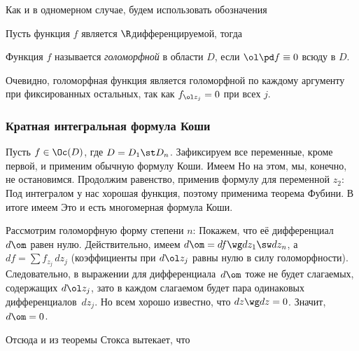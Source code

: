 \documentclass[a4paper]{article}
\begin{document}
Как и в одномерном случае, будем использовать обозначения

Пусть функция $f$ является $\R$\д дифференцируемой, тогда

\begin{df}
Функция $f$ называется \emph{голоморфной} в области $D$, если $\ol \pd f \equiv 0$ всюду в $D$.
\end{df}

Очевидно, голоморфная функция является голоморфной по каждому аргументу при фиксированных
остальных, так как $f_{\ol z_j}=0$ при всех $j$.

\subsubsection{Кратная интегральная формула Коши}

Пусть $f\in \Oc(D)$, где $D = D_1 \st D_n$. Зафиксируем все переменные, кроме первой,
и применим обычную формулу Коши. Имеем
Но на этом, мы, конечно, не остановимся. Продолжим равенство, применив формулу для переменной $z_2$:
Под интегралом у нас хорошая функция, поэтому применима теорема Фубини. В итоге имеем
Это и есть многомерная формула Коши.

\medskip

Рассмотрим голоморфную форму степени $n$:
Покажем, что её дифференциал $d\om$ равен нулю. Действительно, имеем
$d\om = df\wg dz_1\sw dz_n$, а $df = \sum f_{z_j}\,dz_j$ (коэффициенты при $d\ol z_j$
равны нулю в силу голоморфности). Следовательно, в выражении для дифференциала~$d\om$
тоже не будет слагаемых, содержащих $d\ol z_j$, зато в каждом слагаемом будет пара
одинаковых дифференциалов~$dz_j$. Но всем хорошо известно, что $dz\wg dz =0$. Значит, $d\om=0$.

Отсюда и из теоремы Стокса вытекает, что
\end{document}
